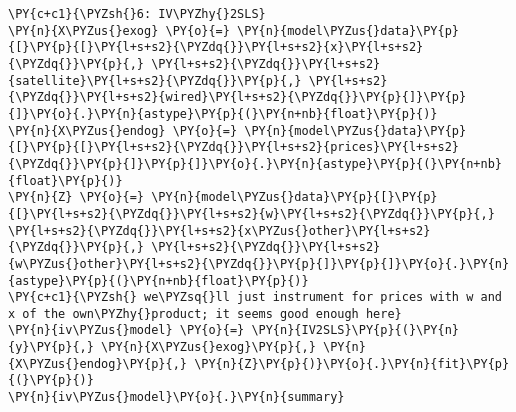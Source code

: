     \begin{tcolorbox}[breakable, size=fbox, boxrule=1pt, pad at break*=1mm,colback=cellbackground, colframe=cellborder]
\begin{Verbatim}[commandchars=\\\{\}]
\PY{c+c1}{\PYZsh{}6: IV\PYZhy{}2SLS}
\PY{n}{X\PYZus{}exog} \PY{o}{=} \PY{n}{model\PYZus{}data}\PY{p}{[}\PY{p}{[}\PY{l+s+s2}{\PYZdq{}}\PY{l+s+s2}{x}\PY{l+s+s2}{\PYZdq{}}\PY{p}{,} \PY{l+s+s2}{\PYZdq{}}\PY{l+s+s2}{satellite}\PY{l+s+s2}{\PYZdq{}}\PY{p}{,} \PY{l+s+s2}{\PYZdq{}}\PY{l+s+s2}{wired}\PY{l+s+s2}{\PYZdq{}}\PY{p}{]}\PY{p}{]}\PY{o}{.}\PY{n}{astype}\PY{p}{(}\PY{n+nb}{float}\PY{p}{)}
\PY{n}{X\PYZus{}endog} \PY{o}{=} \PY{n}{model\PYZus{}data}\PY{p}{[}\PY{p}{[}\PY{l+s+s2}{\PYZdq{}}\PY{l+s+s2}{prices}\PY{l+s+s2}{\PYZdq{}}\PY{p}{]}\PY{p}{]}\PY{o}{.}\PY{n}{astype}\PY{p}{(}\PY{n+nb}{float}\PY{p}{)}
\PY{n}{Z} \PY{o}{=} \PY{n}{model\PYZus{}data}\PY{p}{[}\PY{p}{[}\PY{l+s+s2}{\PYZdq{}}\PY{l+s+s2}{w}\PY{l+s+s2}{\PYZdq{}}\PY{p}{,} \PY{l+s+s2}{\PYZdq{}}\PY{l+s+s2}{x\PYZus{}other}\PY{l+s+s2}{\PYZdq{}}\PY{p}{,} \PY{l+s+s2}{\PYZdq{}}\PY{l+s+s2}{w\PYZus{}other}\PY{l+s+s2}{\PYZdq{}}\PY{p}{]}\PY{p}{]}\PY{o}{.}\PY{n}{astype}\PY{p}{(}\PY{n+nb}{float}\PY{p}{)}
\PY{c+c1}{\PYZsh{} we\PYZsq{}ll just instrument for prices with w and x of the own\PYZhy{}product; it seems good enough here}
\PY{n}{iv\PYZus{}model} \PY{o}{=} \PY{n}{IV2SLS}\PY{p}{(}\PY{n}{y}\PY{p}{,} \PY{n}{X\PYZus{}exog}\PY{p}{,} \PY{n}{X\PYZus{}endog}\PY{p}{,} \PY{n}{Z}\PY{p}{)}\PY{o}{.}\PY{n}{fit}\PY{p}{(}\PY{p}{)}
\PY{n}{iv\PYZus{}model}\PY{o}{.}\PY{n}{summary}
\end{Verbatim}
\end{tcolorbox}

